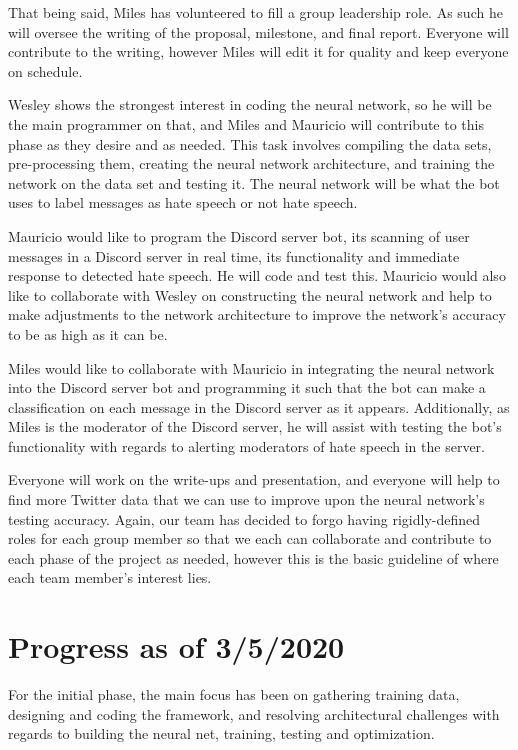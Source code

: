 \documentclass[conference]{sig-alternate-05-2015}
\begin{document}
That being said, Miles has volunteered to fill a group leadership role. As such he will oversee the writing of the proposal, milestone, and final report. Everyone will contribute to the writing, however Miles will edit it for quality and keep everyone on schedule.

Wesley shows the strongest interest in coding the neural network, so he will be the main programmer on that, and Miles and Mauricio will contribute to this phase as they desire and as needed. This task involves compiling the data sets, pre-processing them, creating the neural network architecture, and training the network on the data set and testing it. The neural network will be what the bot uses to label messages as hate speech or not hate speech.

Mauricio would like to program the Discord server bot, its scanning of user messages in a Discord server in real time, its functionality and immediate response to detected hate speech. He will code and test this.  Mauricio would also like to collaborate with Wesley on constructing the neural network and help to make adjustments to the network architecture to improve the network's accuracy to be as high as it can be.

Miles would like to collaborate with Mauricio in integrating the neural network into the Discord server bot and programming it such that the bot can make a classification on each message in the Discord server as it appears. Additionally, as Miles is the moderator of the Discord server, he will assist with testing the bot's functionality with regards to alerting moderators of hate speech in the server. 

Everyone will work on the write-ups and presentation, and everyone will help to find more Twitter data that we can use to improve upon the neural network's testing accuracy. Again, our team has decided to forgo having rigidly-defined roles for each group member so that we each can collaborate and contribute to each phase of the project as needed, however this is the basic guideline of where each team member's interest lies.


\section{Progress as of 3/5/2020}

For the initial phase, the main focus has been on gathering training data, designing and coding the framework, and resolving architectural challenges with regards to building the neural net, training, testing and optimization. 
\end{document}
